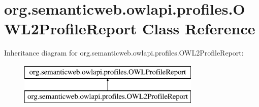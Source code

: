 \hypertarget{classorg_1_1semanticweb_1_1owlapi_1_1profiles_1_1_o_w_l2_profile_report}{\section{org.\-semanticweb.\-owlapi.\-profiles.\-O\-W\-L2\-Profile\-Report Class Reference}
\label{classorg_1_1semanticweb_1_1owlapi_1_1profiles_1_1_o_w_l2_profile_report}
}
Inheritance diagram for org.\-semanticweb.\-owlapi.\-profiles.\-O\-W\-L2\-Profile\-Report\-:\begin{figure}[H]
\begin{center}
\leavevmode
\includegraphics[height=2.000000cm]{classorg_1_1semanticweb_1_1owlapi_1_1profiles_1_1_o_w_l2_profile_report}
\end{center}
\end{figure}
